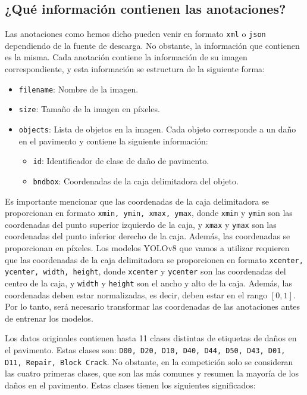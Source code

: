 \subsection{¿Qué información contienen las anotaciones?}
Las anotaciones como hemos dicho pueden venir en formato \texttt{xml} o \texttt{json} dependiendo de la fuente de descarga. No obstante, la información que contienen es la misma. Cada anotación contiene la información de su imagen correspondiente, y esta información se estructura de la siguiente forma:
\begin{itemize}
    \item \texttt{filename}: Nombre de la imagen.
    \item \texttt{size}: Tamaño de la imagen en píxeles.
    \item \texttt{objects}: Lista de objetos en la imagen. Cada objeto corresponde a un daño en el pavimento y contiene la siguiente información:
    \begin{itemize}
        \item \texttt{id}: Identificador de clase de daño de pavimento.
        \item \texttt{bndbox}: Coordenadas de la caja delimitadora del objeto.
    \end{itemize}
\end{itemize}
Es importante mencionar que las coordenadas de la caja delimitadora se proporcionan en formato \texttt{xmin, ymin, xmax, ymax}, donde \texttt{xmin} y \texttt{ymin} son las coordenadas del punto superior izquierdo de la caja, y \texttt{xmax} y \texttt{ymax} son las coordenadas del punto inferior derecho de la caja. Además, las coordenadas se proporcionan en píxeles. Los modelos YOLOv8 que vamos a utilizar requieren que las coordenadas de la caja delimitadora se proporcionen en formato \texttt{xcenter, ycenter, width, height}, donde \texttt{xcenter} y \texttt{ycenter} son las coordenadas del centro de la caja, y \texttt{width} y \texttt{height} son el ancho y alto de la caja. Además, las coordenadas deben estar normalizadas, es decir, deben estar en el rango $[0, 1]$. Por lo tanto, será necesario transformar las coordenadas de las anotaciones antes de entrenar los modelos.

Los datos originales contienen hasta 11 clases distintas de etiquetas de daños en el pavimento. Estas clases son: \texttt{D00, D20, D10, D40, D44, D50, D43, D01, D11, Repair, Block Crack}. No obstante, en la competición solo se consideran las cuatro primeras clases, que son las más comunes y resumen la mayoría de los daños en el pavimento. Estas clases tienen los siguientes significados:

